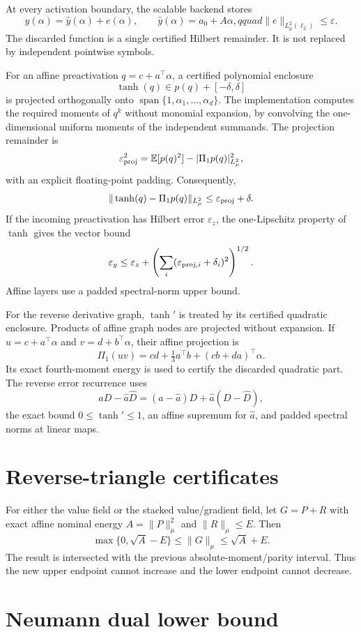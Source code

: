 \documentclass[11pt]{article}
\begin{document}
At every activation boundary, the scalable backend stores
\[
 y(\alpha)=\widehat y(\alpha)+e(\alpha),\qquad
 \widehat y(\alpha)=a_0+A\alpha,qquad
 \|e\|_{L^2_\mu(\ell_2)}\leq\varepsilon.
\]
The discarded function is a single certified Hilbert remainder.  It is not
replaced by independent pointwise symbols.

For an affine preactivation \(q=c+a^\top\alpha\), a certified polynomial
enclosure
\[
 \tanh(q)\in p(q)+[-\delta,\delta]
\]
is projected orthogonally onto
\(\operatorname{span}\{1,\alpha_1,\ldots,\alpha_d\}\).  The implementation
computes the required moments of \(q^k\) without monomial expansion, by
convolving the one-dimensional uniform moments of the independent summands.
The projection remainder is
\[
 \varepsilon_{\rm proj}^2
 =\mathbb E[p(q)^2]-|\Pi_1p(q)|^2_{L^2_\mu},
\]
with an explicit floating-point padding.  Consequently,
\[
 \|\tanh(q)-\Pi_1p(q)\|_{L^2_\mu}
 \leq \varepsilon_{\rm proj}+\delta.
\]
If the incoming preactivation has Hilbert error \(\varepsilon_z\), the
one-Lipschitz property of \(\tanh\) gives the vector bound
\[
 \varepsilon_y\leq \varepsilon_z+
 \left(\sum_i(\varepsilon_{{\rm proj},i}+\delta_i)^2\right)^{1/2}.
\]
Affine layers use a padded spectral-norm upper bound.

For the reverse derivative graph, \(\tanh'\) is treated by its certified
quadratic enclosure.  Products of affine graph nodes are projected without
expansion.  If
\(u=c+a^\top\alpha\) and \(v=d+b^\top\alpha\), their affine projection is
\[
 \Pi_1(uv)=cd+\tfrac13a^\top b+(cb+da)^\top\alpha.
\]
Its exact fourth-moment energy is used to certify the discarded quadratic
part.  The reverse error recurrence uses
\[
 aD-\widehat a\widehat D=(a-\widehat a)D
 +\widehat a(D-\widehat D),
\]
the exact bound \(0\leq\tanh'\leq1\), an affine supremum for
\(\widehat a\), and padded spectral norms at linear maps.

\section{Reverse-triangle certificates}

For either the value field or the stacked value/gradient field, let
\(G=P+R\) with exact affine nominal energy \(A=\|P\|_\mu^2\) and
\(\|R\|_\mu\leq E\).  Then
\[
 \max\{0,\sqrt A-E\}\leq\|G\|_\mu\leq\sqrt A+E.
\]
The result is intersected with the previous absolute-moment/parity interval.
Thus the new upper endpoint cannot increase and the lower endpoint cannot
decrease.

\section{Neumann dual lower bound}
\end{document}
